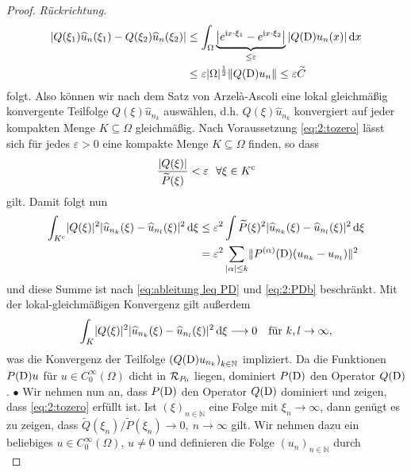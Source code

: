 \begin{proof} {\it Rückrichtung.}
\begin{align}
| Q(\xi_1)\widehat{u}_n(\xi_1) - Q(\xi_2)\widehat{u}_n(\xi_2)| & \leq \int_{\Omega}  \underbrace{\left| e^{\mathrm i x \cdot \xi_1} - e^{\mathrm i x \cdot \xi_2} \right| }_{\leq \varepsilon} | Q(\mathrm D) u_n(x)| \,\mathrm d x 
\\ & \leq \varepsilon |\Omega|^{\frac{1}{2}} \Vert Q(\mathrm D)u_n \Vert \leq \varepsilon \widetilde{C}
\end{align}
folgt. Also können wir nach dem Satz von Arzel\`a-Ascoli eine lokal gleichmäßig konvergente Teilfolge $Q(\xi)\widehat{u}_{n_k}$ auswählen, d.h. $Q(\xi)\widehat{u}_{n_k}$ konvergiert auf jeder kompakten Menge $K \subseteq \Omega$ gleichmäßig.
Nach Voraussetzung \eqref{eq:2:tozero} lässt sich für jedes $\varepsilon > 0$ eine kompakte Menge $K \subseteq \Omega$ finden, so dass 
\begin{equation}
\frac{\lvert Q(\xi)\rvert}{\widetilde{P}(\xi)} <\varepsilon \ \ \forall \xi \in K^{\mathrm{c}}
\end{equation}
gilt. Damit folgt nun
\begin{align}
\int_{K^{\mathrm c}}\lvert Q(\xi)\rvert^2\lvert\widehat{u}_{n_k}(\xi)-\widehat{u}_{n_l}(\xi)\rvert^2\,\mathrm d \xi
&\leq\varepsilon^2\int\widetilde{P}(\xi)^2\lvert\widehat{u}_{n_k}(\xi)-\widehat{u}_{n_l}(\xi)\rvert^2\,\mathrm d \xi\\
&=\varepsilon^2\sum_{|\alpha| \leq k}\lVert P^{(\alpha)}(\mathrm D)(u_{n_k}-u_{n_l})\rVert^2\label{eq:2:Kcsum}
\end{align}
und diese Summe ist nach \eqref{eq:ableitung leq PD}
und \eqref{eq:2:PDb} beschränkt.
Mit der lokal-gleichmäßigen Konvergenz gilt außerdem
\begin{equation}
\int_K\lvert Q(\xi)\rvert^2\lvert\widehat{u}_{n_k}(\xi)-\widehat{u}_{n_l}(\xi)\rvert^2\,\mathrm d \xi\longrightarrow0
\quad\text{für}~ k,l \rightarrow \infty,
\end{equation}
was die Konvergenz der Teilfolge $\left(Q(\mathrm D)u_{n_k} \right)_{k \in \mathbb{N}}$ impliziert. Da die Funktionen $P(\mathrm D)u$ für $u\in C^\infty_0(\Omega)$ dicht in $\mathcal R_{P_0}$ liegen, dominiert $P(\mathrm D)$ den Operator $Q(\mathrm D)$.
$\bullet$
Wir nehmen nun an, dass $P(\mathrm D)$ den Operator $Q(\mathrm D)$ dominiert und zeigen, dass \eqref{eq:2:tozero} erfüllt ist.
 Ist $(\xi)_{n \in \mathbb{N}}$ eine Folge mit $\xi_n \rightarrow \infty$, dann genügt es zu zeigen, dass $\widetilde{Q}(\xi_{n})/\widetilde{P}(\xi_{n})\to0, \ n \rightarrow \infty$ gilt.
Wir nehmen dazu ein beliebiges $u\in C^\infty_0(\Omega)$, $u\neq0$ und definieren die Folge $(u_n)_{n \in \mathbb{N}}$ durch
\begin{equation}

\end{equation}
\end{proof}
